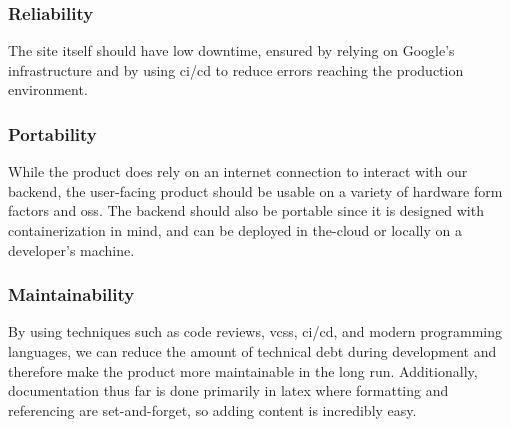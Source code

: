         \subsubsection{Reliability}
            The site itself should have low downtime, ensured by relying on Google's infrastructure and by using \gls{ci}/\gls{cd} to reduce errors reaching the production environment. 
        \subsubsection{Portability}
            While the product does rely on an internet connection to interact with our backend, the user-facing product should be usable on a variety of hardware form factors and \glspl{os}. The backend should also be portable since it is designed with containerization in mind, and can be deployed in \gls{the-cloud} or locally on a developer's machine.
        \subsubsection{Maintainability}
            By using techniques such as code reviews, \glspl{vcs}, \gls{ci}/\gls{cd}, and modern programming languages, we can reduce the amount of technical debt during development and therefore make the product more maintainable in the long run. Additionally, documentation thus far is done primarily in \gls{latex} where formatting and referencing are set-and-forget, so adding content is incredibly easy.
